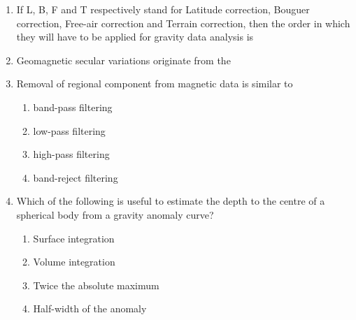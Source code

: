 \documentclass[journal,12pt,onecolumn]{IEEEtran}
\theoremstyle{remark}
\begin{document}
\begin{enumerate}[start = 26 ]
        \item If L, B, F and T respectively stand for Latitude correction, Bouguer correction, Free-air correction and Terrain correction, then the order in which they will have to be applied for gravity data analysis is \hfill{}
            \begin{enumerate}
            \end{enumerate}
        
        \item Geomagnetic secular variations originate from the \hfill{}
            \begin{enumerate}
            \end{enumerate}

        \item Removal of regional component from magnetic data is similar to \hfill{}
            \begin{enumerate}
                    \item band-pass filtering
                    \item low-pass filtering
                    \item high-pass filtering
                    \item band-reject filtering
            \end{enumerate}
        
        \item Which of the following is useful to estimate the depth to the centre of a spherical body from a gravity anomaly curve? \hfill{}
            \begin{enumerate}
                    \item Surface integration
                    \item Volume integration
                    \item Twice the absolute maximum
                    \item Half-width of the anomaly
            \end{enumerate}
        

\end{enumerate}
\end{document}
